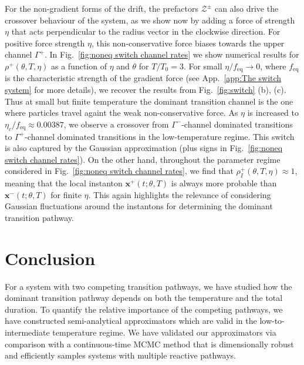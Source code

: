 For the non-gradient forms of the drift, the prefactors $\mathcal{Z^{\pm}}$
can also drive the crossover behaviour of the system, as we show now
by adding a force of strength $\eta$ that acts perpendicular to the
radius vector in the clockwise direction. For positive force strength
$\eta$, this non-conservative force biases towards the upper channel
$\Gamma^{+}$. In Fig.~\ref{fig:noneq switch channel rates} we show numerical
results for $\rho^{+}(\theta,T,\eta)$ as a function of $\eta$ and $\theta$
for $T/T_{0}=3$. For small $\eta/f_{\text{eq}}\rightarrow0$, where
$f_{\text{eq}}$ is the characteristic strength of the gradient force
(see App.~\ref{app:The switch system} for more details), we recover the results from Fig.~\ref{fig:switch}
(b), (c). Thus at small but finite temperature the dominant transition
channel is the one where particles travel againt the weak non-conservative
force. As $\eta$ is increased to $\eta_{c}/f_{\text{eq}}\approx0.00387$,
we observe a crossover from $\Gamma^{-}$-channel dominated transitions
to $\Gamma^{+}$-channel dominated transitions in the low-temperature
regime. This switch is also captured by the Gaussian approximation
(plus signs in Fig.~\ref{fig:noneq switch channel rates}). On the other hand,
throughout the parameter regime considered in Fig.~\ref{fig:noneq switch channel rates},
we find that $\rho_{I}^{+}(\theta,T,\eta)\approx1$, meaning that the
local instanton $\mathbf{x}^{+}(t;\theta,T)$ is always more probable than $\mathbf{x}^{-}(t;\theta,T)$ for finite $\eta$. This again highlights the relevance of considering Gaussian fluctuations around the instantons for determining the dominant
transition pathway.

\section{Conclusion}

For a system with two competing transition pathways,
we have studied how the dominant transition pathway depends on both
the temperature and the total duration. To quantify the relative importance
of the competing pathways, we have constructed semi-analytical approximators
which are valid in the low-to-intermediate temperature regime. We
have validated our approximators via comparison with a continuous-time
MCMC method that is dimensionally robust and efficiently samples systems
with multiple reactive pathways.

